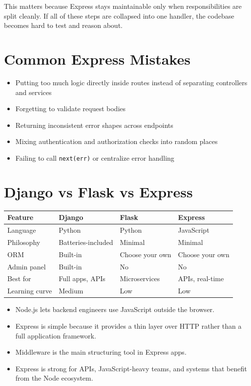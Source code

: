 \documentclass[12pt, a4paper, oneside]{book}
\begin{document}
This matters because Express stays maintainable only when responsibilities are split cleanly. If all of these steps are collapsed into one handler, the codebase becomes hard to test and reason about.

\section{Common Express Mistakes}

\begin{itemize}[leftmargin=2em]
    \item Putting too much logic directly inside routes instead of separating controllers and services
    \item Forgetting to validate request bodies
    \item Returning inconsistent error shapes across endpoints
    \item Mixing authentication and authorization checks into random places
    \item Failing to call \texttt{next(err)} or centralize error handling
\end{itemize}

\section{Django vs Flask vs Express}

\begin{center}
\begin{tabular}{l l l l}
\toprule
\textbf{Feature} & \textbf{Django} & \textbf{Flask} & \textbf{Express} \\
\midrule
Language & Python & Python & JavaScript \\
Philosophy & Batteries-included & Minimal & Minimal \\
ORM & Built-in & Choose your own & Choose your own \\
Admin panel & Built-in & No & No \\
Best for & Full apps, APIs & Microservices & APIs, real-time \\
Learning curve & Medium & Low & Low \\
\bottomrule
\end{tabular}
\end{center}

\begin{summarybox}
\begin{itemize}[leftmargin=2em]
    \item Node.js lets backend engineers use JavaScript outside the browser.
    \item Express is simple because it provides a thin layer over HTTP rather than a full application framework.
    \item Middleware is the main structuring tool in Express apps.
    \item Express is strong for APIs, JavaScript-heavy teams, and systems that benefit from the Node ecosystem.
\end{itemize}
\end{summarybox}
\end{document}
